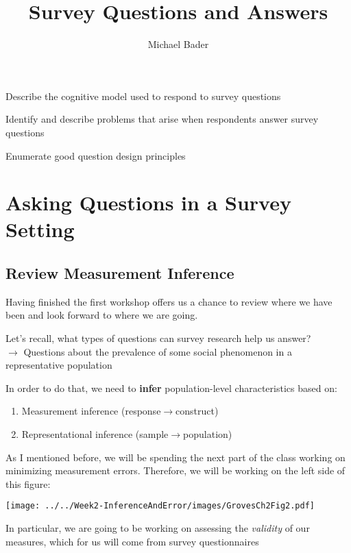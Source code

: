 \documentclass[11pt]{lecturenotes}
\title{Survey Questions and Answers}
\author{Michael Bader}
\begin{document}
\maketitle

\begin{objectives}{
\item Describe the cognitive model used to respond to survey questions
\item Identify and describe problems that arise when respondents answer survey questions 
\item Enumerate good question design principles
}{
\objExplainPrinciples
\objDevelopQuestions
}
\end{objectives}

\section{Asking Questions in a Survey Setting}
\subsection[15]{Review Measurement Inference}
Having finished the first workshop offers us a chance to review where we have been and look forward to where we are going. 

\slide
Let's recall, what types of questions can survey research help us answer?\\
$\longrightarrow$ Questions about the prevalence of some social phenomenon in a representative population

In order to do that, we need to \textbf{infer} population-level characteristics based on: 
\begin{enumerate}[label=\Alph*]
\item Measurement inference (response$\rightarrow$construct)
\item Representational inference (sample$\rightarrow$population)
\end{enumerate}

As I mentioned before, we will be spending the next part of the class working on minimizing measurement errors. Therefore, we will be working on the left side of this figure: \slide

\begin{center}
\texttt{[image: ../../Week2-InferenceAndError/images/GrovesCh2Fig2.pdf]}
\end{center}

In particular, we are going to be working on assessing the \emph{validity} of our measures, which for us will come from survey questionnaires
\end{document}
